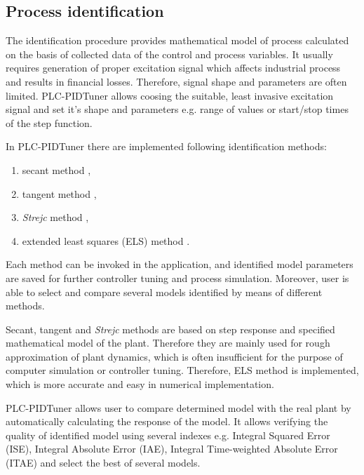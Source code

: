 \documentclass{amcs}
\begin{document}
\subsection{Process identification}
%
The identification procedure provides mathematical model of process calculated on the basis of collected data of the control and process variables. It usually requires generation of proper excitation signal which affects industrial process and results in financial losses. Therefore, signal shape and parameters are often limited. PLC-PIDTuner allows coosing the suitable, least invasive excitation signal and set it's shape and parameters e.g. range of values or start/stop times of the step function.

In PLC-PIDTuner there are implemented following identification methods:
\begin{enumerate}
	\item secant method \cite{Haber:1999},
	\item tangent method \cite{Haber:1999},
	\item \textit{Strejc} method \cite{Strejc:1959},
	\item extended least squares (ELS) method  \cite{Janiszowski:2002}.
\end{enumerate}

Each method can be invoked in the application, and identified model parameters are saved for further controller tuning and process simulation. Moreover, user is able to select and compare several models identified by means of different methods. 

Secant, tangent and \textit{Strejc} methods are based on step response and specified mathematical model of the plant. Therefore they are mainly used for rough approximation of plant dynamics, which is often insufficient for the purpose of computer simulation or controller tuning. Therefore, ELS method is implemented, which is more accurate and easy in numerical implementation. 

PLC-PIDTuner allows user to compare determined model with the real plant by automatically calculating the response of the model. It allows verifying the quality of identified model using several indexes e.g. Integral Squared Error (ISE),  Integral Absolute Error (IAE), Integral Time-weighted Absolute Error (ITAE) and select the best of several models.
\end{document}
